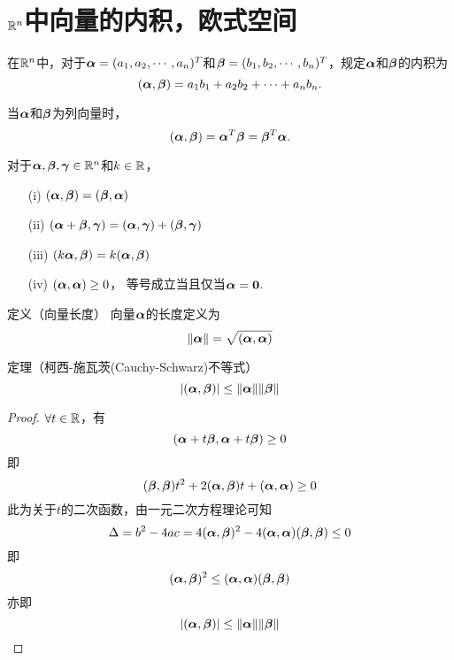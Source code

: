 \section{$\R^n$中向量的内积，欧式空间}


\begin{dingyi} 
  在$\R^n$中，对于$\alphabd=(a_1,a_2,\cd,a_n)^T$和$\betabd=(b_1,b_2,\cd,b_n)^T$，规定$\alphabd$和$\betabd$的内积为
  $$
  (\alphabd,\betabd)=a_1b_1+a_2b_2+\cd+a_nb_n.
  $$
\end{dingyi}
当$\alphabd$和$\betabd$为列向量时，
$$
(\alphabd,\betabd)=\alphabd^T\betabd=\betabd^T\alphabd.
$$





\begin{xingzhi}[内积的运算性质]
  对于$\alphabd,\betabd,\gammabd\in\R^n$和$k\in\R$，
  \begin{itemize}
  \item[(i)]   $(\alphabd,\betabd)=(\betabd,\alphabd)$
  \item[(ii)]  $(\alphabd+\betabd,\gammabd)=(\alphabd,\gammabd)+(\betabd,\gammabd)$
  \item[(iii)] $(k\alphabd,\betabd)=k(\alphabd,\betabd)$
  \item[(iv)]  $(\alphabd,\alphabd)\ge0$， 等号成立当且仅当$\alphabd=\zero$.
  \end{itemize}
\end{xingzhi}

\begin{dingyi}{定义（向量长度）}
  向量$\alphabd$的长度定义为
  $$
  \|\alphabd\|=\sqrt{(\alphabd,\alphabd)}
  $$
\end{dingyi}






\begin{dingli}{定理（柯西-施瓦茨(Cauchy-Schwarz)不等式）}
  $$
  |(\alphabd,\betabd)|\le\|\alphabd\|\|\betabd\|
  $$
\end{dingli}
 
\begin{proof}
$\forall t \in \R$，有
$$
(\alphabd+t\betabd,\alphabd+t\betabd) \ge 0
$$
即
$$
(\betabd,\betabd)t^2+2(\alphabd,\betabd)t+(\alphabd,\alphabd)\ge0
$$
此为关于$t$的二次函数，由一元二次方程理论可知
$$
\Delta = b^2-4ac = 4 (\alphabd,\betabd)^2-4(\alphabd,\alphabd)(\betabd,\betabd)\le 0
$$
即
$$
(\alphabd,\betabd)^2\le (\alphabd,\alphabd)(\betabd,\betabd)
$$
亦即
$$
|(\alphabd,\betabd)|\le\|\alphabd\|\|\betabd\|
$$
\end{proof}



